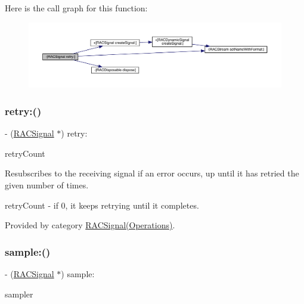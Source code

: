 Here is the call graph for this function\+:\nopagebreak
\begin{figure}[H]
\begin{center}
\leavevmode
\includegraphics[width=350pt]{interface_r_a_c_signal_a3601540c46ceb34dbd1c242782022809_cgraph}
\end{center}
\end{figure}
\mbox{\label{interface_r_a_c_signal_a3601540c46ceb34dbd1c242782022809}} 
\subsubsection{\texorpdfstring{retry\+:()}{retry:()}\hspace{0.1cm}{\footnotesize\ttfamily [3/3]}}
{\footnotesize\ttfamily -\/ (\mbox{\hyperlink{interface_r_a_c_signal}{R\+A\+C\+Signal}} $\ast$) retry\+: \begin{DoxyParamCaption}\item[{(N\+S\+Integer)}]{retry\+Count }\end{DoxyParamCaption}}

Resubscribes to the receiving signal if an error occurs, up until it has retried the given number of times.

retry\+Count -\/ if 0, it keeps retrying until it completes. 

Provided by category \mbox{\hyperlink{category_r_a_c_signal_07_operations_08_a3601540c46ceb34dbd1c242782022809}{R\+A\+C\+Signal(\+Operations)}}.

\mbox{\label{interface_r_a_c_signal_a556702f113ba65f01fabf8363bd25e46}} 
\subsubsection{\texorpdfstring{sample\+:()}{sample:()}\hspace{0.1cm}{\footnotesize\ttfamily [1/3]}}
{\footnotesize\ttfamily -\/ (\mbox{\hyperlink{interface_r_a_c_signal}{R\+A\+C\+Signal}} $\ast$) sample\+: \begin{DoxyParamCaption}\item[{(\mbox{\hyperlink{interface_r_a_c_signal}{R\+A\+C\+Signal}} $\ast$)}]{sampler }\end{DoxyParamCaption}}

